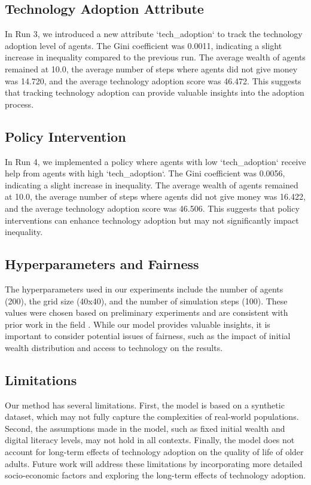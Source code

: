 \documentclass{article} %
\begin{document}
\subsection{Technology Adoption Attribute}
In Run 3, we introduced a new attribute `tech_adoption` to track the technology adoption level of agents. The Gini coefficient was 0.0011, indicating a slight increase in inequality compared to the previous run. The average wealth of agents remained at 10.0, the average number of steps where agents did not give money was 14.720, and the average technology adoption score was 46.472. This suggests that tracking technology adoption can provide valuable insights into the adoption process.

\subsection{Policy Intervention}
In Run 4, we implemented a policy where agents with low `tech_adoption` receive help from agents with high `tech_adoption`. The Gini coefficient was 0.0056, indicating a slight increase in inequality. The average wealth of agents remained at 10.0, the average number of steps where agents did not give money was 16.422, and the average technology adoption score was 46.506. This suggests that policy interventions can enhance technology adoption but may not significantly impact inequality.

\subsection{Hyperparameters and Fairness}
The hyperparameters used in our experiments include the number of agents (200), the grid size (40x40), and the number of simulation steps (100). These values were chosen based on preliminary experiments and are consistent with prior work in the field \citep{poledna2023economic}. While our model provides valuable insights, it is important to consider potential issues of fairness, such as the impact of initial wealth distribution and access to technology on the results.

\subsection{Limitations}
Our method has several limitations. First, the model is based on a synthetic dataset, which may not fully capture the complexities of real-world populations. Second, the assumptions made in the model, such as fixed initial wealth and digital literacy levels, may not hold in all contexts. Finally, the model does not account for long-term effects of technology adoption on the quality of life of older adults. Future work will address these limitations by incorporating more detailed socio-economic factors and exploring the long-term effects of technology adoption.
\end{document}
